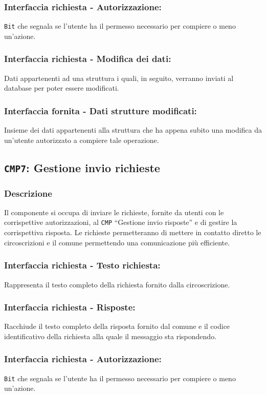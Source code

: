         \subsubsection{Interfaccia richiesta - Autorizzazione:}
            \texttt{Bit} che segnala se l'utente ha il permesso necessario per compiere o meno un'azione.
        \subsubsection{Interfaccia richiesta - Modifica dei dati:}
            Dati appartenenti ad una struttura i quali, in seguito, verranno inviati al database per poter essere modificati.
        \subsubsection{Interfaccia fornita - Dati strutture modificati:}
            Insieme dei dati appartenenti alla struttura che ha appena subito una modifica da un'utente autorizzato a compiere tale operazione.

    \subsection{\texttt{CMP7}: Gestione invio richieste}
        \subsubsection{Descrizione}
            Il componente si occupa di inviare le richieste, fornite da utenti con le corrispettive autorizzazioni, al \texttt{CMP} ``Gestione invio risposte'' e di gestire la corrispettiva risposta. Le richieste permetteranno di mettere in contatto diretto le circoscrizioni e il comune permettendo una comunicazione più efficiente.
        \subsubsection{Interfaccia richiesta - Testo richiesta:}
            Rappresenta il testo completo della richiesta fornito dalla circoscrizione.
        \subsubsection{Interfaccia richiesta - Risposte:}
            Racchiude il testo completo della risposta fornito dal comune e il codice identificativo della richiesta alla quale il messaggio sta rispondendo.
        \subsubsection{Interfaccia richiesta - Autorizzazione:}
            \texttt{Bit} che segnala se l'utente ha il permesso necessario per compiere o meno un'azione.
